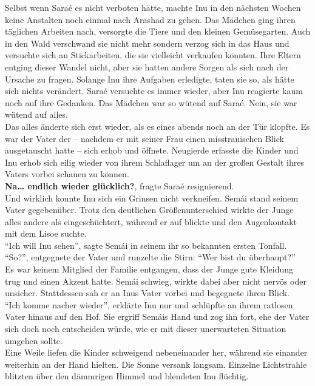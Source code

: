\documentclass[a4paper,12pt]{book}
\begin{document}
Selbst wenn Saraé es nicht verboten hätte, machte Inu in den nächsten Wochen keine Anstalten noch 
einmal nach Arashad zu gehen. Das Mädchen ging ihren täglichen Arbeiten nach, versorgte die Tiere 
und den kleinen Gemüsegarten. Auch in den Wald verschwand sie nicht mehr sondern verzog sich in das 
Haus und versuchte sich an Stickarbeiten, die sie vielleicht verkaufen könnten. Ihre Eltern entging 
dieser Wandel nicht, aber sie hatten andere Sorgen als sich nach der Ursache zu fragen. Solange Inu 
ihre Aufgaben erledigte, taten sie so, als hätte sich nichts verändert. Saraé versuchte es immer 
wieder, aber Inu reagierte kaum noch auf ihre Gedanken. Das Mädchen war so wütend auf Saraé. Nein, 
sie war wütend auf alles. \\
Das alles änderte sich erst wieder, als es eines abends noch an der Tür klopfte. Es war der Vater 
der – nachdem er mit seiner Frau einen misstrauischen Blick ausgetauscht hatte – sich erhob und 
öffnete. Neugierde erfasste die Kinder und Inu erhob sich eilig wieder von ihrem Schlaflager um an 
der großen Gestalt ihres Vaters vorbei schauen zu können.\\
\textbf{Na… endlich wieder glücklich?}, fragte Saraé resignierend.\\
Und wirklich konnte Inu sich ein Grinsen nicht verkneifen. Semái stand seinem Vater gegebenüber. 
Trotz den deutlichen Größenunterschied wirkte der Junge alles andere als eingeschüchtert, während 
er auf blickte und den Augenkontakt mit dem Lisoe suchte. \\
``Ich will Inu sehen'', sagte Semái in seinem ihr so bekannten ersten Tonfall. \\
``So?'', entgegnete der Vater und runzelte die Stirn: ``Wer bist du überhaupt?''\\
Es war keinem Mitglied der Familie entgangen, dass der Junge gute Kleidung trug und einen Akzent 
hatte. Semái schwieg, wirkte dabei aber nicht nervös oder unsicher. Stattdessen sah er an Inus 
Vater vorbei und begegnete ihren Blick.\\
``Ich komme nacher wieder'', erklärte Inu nur und schlüpfte an ihrem ratlosen Vater hinaus auf den 
Hof. Sie ergriff Semáis Hand und zog ihn fort, ehe der Vater sich doch noch entscheiden würde, wie 
er mit dieser unerwarteten Situation umgehen sollte. \\
Eine Weile liefen die Kinder schweigend nebeneinander her, während sie einander weiterhin an der 
Hand hielten. Die Sonne versank langsam. Einzelne Lichtstrahle blitzten über den dämmrigen Himmel 
und blendeten Inu flüchtig.\\
\end{document}
